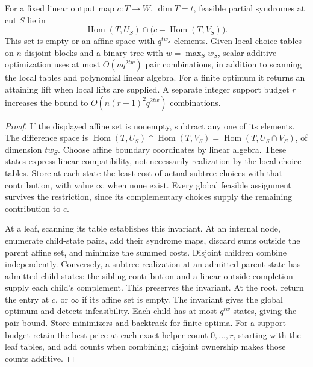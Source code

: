 \begin{proposition}
\label{prop:boundary-width-compilation}
%
%
For a fixed linear output map $c:T\to W$, $\dim T=t$, feasible partial
syndromes at cut $S$ lie in
\[
 \operatorname{Hom}(T,U_S)\cap
       \bigl(c-\operatorname{Hom}(T,V_S)\bigr).
\]
This set is empty or an affine space with $q^{t w_S}$ elements.
Given local choice tables on $n$ disjoint blocks and a binary tree with
$w=\max_S w_S$, scalar additive optimization uses at most
$O(nq^{2tw})$ pair combinations, in addition to scanning the local tables
and polynomial linear algebra.  For a finite optimum it returns an attaining
lift when local lifts are supplied.  A separate integer support budget $r$
increases the bound to $O(n(r+1)^2q^{2tw})$ combinations.
\end{proposition}

\begin{proof}
If the displayed affine set is nonempty, subtract any one of its elements.
The difference space is
$\operatorname{Hom}(T,U_S)\cap\operatorname{Hom}(T,V_S)
=\operatorname{Hom}(T,U_S\cap V_S)$, of dimension $tw_S$.
Choose affine boundary coordinates by linear algebra.  These states express
linear compatibility, not necessarily realization by the local choice tables.
Store at each state the least cost of actual subtree choices with that
contribution, with value $\infty$ when none exist.  Every global feasible
assignment survives the restriction, since its complementary choices supply
the remaining contribution to $c$.

At a leaf, scanning its table establishes this invariant.  At an internal
node, enumerate child-state pairs, add their syndrome maps, discard sums
outside the parent affine set, and minimize the summed costs.  Disjoint
children combine independently.  Conversely, a subtree realization at an
admitted parent state has admitted child states: the sibling contribution
and a linear outside completion supply each child's complement.  This
preserves the invariant.  At the root, return the entry at $c$, or $\infty$
if its affine set is empty.  The invariant gives the global optimum and
detects infeasibility.  Each child has at
most $q^{tw}$ states, giving the pair bound.  Store minimizers and backtrack
for finite optima.  For a support budget retain the best price at each exact
helper count $0,\ldots,r$, starting with the leaf tables, and add counts when
combining; disjoint ownership makes those counts additive.
%
%
\end{proof}

